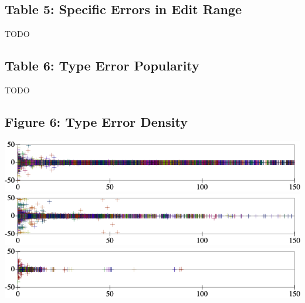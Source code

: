 \documentclass{article}
\begin{document}
\subsection*{Table 5: Specific Errors in Edit Range}

TODO


\subsection*{Table 6: Type Error Popularity}

TODO

{\footnotesize

}


\subsection*{Figure 6: Type Error Density}

\includegraphics[width=\columnwidth]{out/error-count-nocheck-row--te-density-diff.pdf}
\includegraphics[width=\columnwidth]{out/error-count-nonstrict-row--te-density-diff.pdf}
\includegraphics[width=\columnwidth]{out/error-count-strict-row--te-density-diff.pdf}
\end{document}
